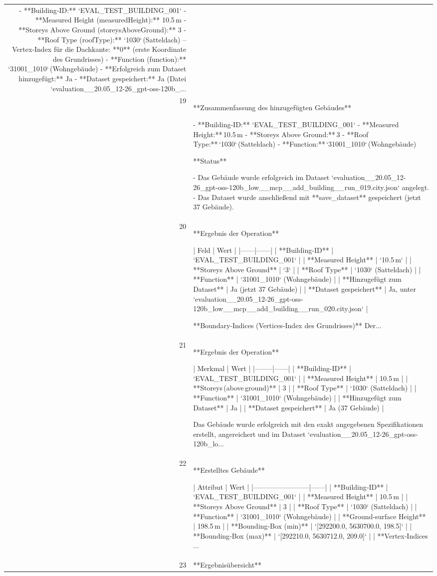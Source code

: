 \documentclass[a4paper,11pt]{article}
\begin{document}
\begin{table}[ht]
\begin{tabular}{r p{12cm}}
- **Building‑ID:** `EVAL\_TEST\_BUILDING\_001`  
- **Measured Height (measuredHeight):** 10.5 m  
- **Storeys Above Ground (storeysAboveGround):** 3  
- **Roof Type (roofType):** `1030` (Satteldach) – Vertex‑Index für die Dachkante: **0** (erste Koordinate des Grundrisses)  
- **Function (function):** `31001\_1010` (Wohngebäude)  
- **Erfolgreich zum Dataset hinzugefügt:** Ja  
- **Dataset gespeichert:** Ja (Datei `evaluation\_\_20.05\_12-26\_gpt-oss-120b\_... \\
19 & **Zusammenfassung des hinzugefügten Gebäudes**

- **Building‑ID:** `EVAL\_TEST\_BUILDING\_001`  
- **Measured Height:** 10.5 m  
- **Storeys Above Ground:** 3  
- **Roof Type:** `1030` (Satteldach)  
- **Function:** `31001\_1010` (Wohngebäude)  

**Status**

- Das Gebäude wurde erfolgreich im Dataset `evaluation\_\_20.05\_12-26\_gpt-oss-120b\_low\_\_mcp\_\_add\_building\_\_run\_019.city.json` angelegt.  
- Das Dataset wurde anschließend mit **save\_dataset** gespeichert (jetzt 37 Gebäude). \\
20 & **Ergebnis der Operation**

| Feld | Wert |
|------|------|
| **Building-ID** | `EVAL\_TEST\_BUILDING\_001` |
| **Measured Height** | `10.5 m` |
| **Storeys Above Ground** | `3` |
| **Roof Type** | `1030` (Satteldach) |
| **Function** | `31001\_1010` (Wohngebäude) |
| **Hinzugefügt zum Dataset** | Ja (jetzt 37 Gebäude) |
| **Dataset gespeichert** | Ja, unter `evaluation\_\_20.05\_12-26\_gpt-oss-120b\_low\_\_mcp\_\_add\_building\_\_run\_020.city.json` |

**Boundary‑Indices (Vertices‑Index des Grundrisses)**  
Der... \\
21 & **Ergebnis der Operation**

| Merkmal | Wert |
|--------|------|
| **Building-ID** | `EVAL\_TEST\_BUILDING\_001` |
| **Measured Height** | 10.5 m |
| **Storeys (above ground)** | 3 |
| **Roof Type** | `1030` (Satteldach) |
| **Function** | `31001\_1010` (Wohngebäude) |
| **Hinzugefügt zum Dataset** | Ja |
| **Dataset gespeichert** | Ja (37 Gebäude) |

Das Gebäude wurde erfolgreich mit den exakt angegebenen Spezifikationen erstellt, angereichert und im Dataset `evaluation\_\_20.05\_12-26\_gpt-oss-120b\_lo... \\
22 & **Erstelltes Gebäude**

| Attribut                | Wert |
|------------------------|------|
| **Building‑ID**        | `EVAL\_TEST\_BUILDING\_001` |
| **Measured Height**    | 10.5 m |
| **Storeys Above Ground** | 3 |
| **Roof Type**          | `1030` (Satteldach) |
| **Function**           | `31001\_1010` (Wohngebäude) |
| **Ground‑surface Height** | 198.5 m |
| **Bounding‑Box (min)** | `[292200.0, 5630700.0, 198.5]` |
| **Bounding‑Box (max)** | `[292210.0, 5630712.0, 209.0]` |
| **Vertex‑Indices ... \\
23 & **Ergebnisübersicht**


\end{tabular}
\end{table}
\end{document}
